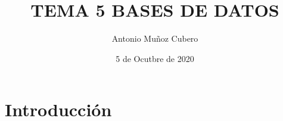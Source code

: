 \documentclass{article}
\title{TEMA 5 BASES DE DATOS}
\author{Antonio Muñoz Cubero}
\date{5 de Ocutbre de 2020}
\begin{document}
\maketitle
{}

\newpage
\section{Introducción}
\end{document}
